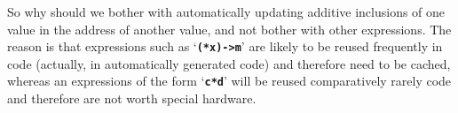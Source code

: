 \documentclass[12pt]{article}
\newcommand{\TT}[1]{{\tt \bfseries #1}}
\begin{document}
So why should we bother with automatically updating
additive inclusions of one value in the
address of another value, and not bother with other expressions.
The reason is that expressions such as
`\TT{(*x)->m}' are likely to be reused frequently in code (actually,
in automatically generated code) and
therefore need to be cached, whereas an expressions of the form
`\TT{c*d}' will be reused comparatively rarely code
and therefore are not worth special hardware.





\printindex
\end{document}
